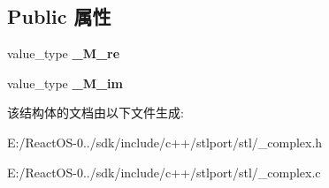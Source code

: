 \subsection*{Public 属性}
\begin{DoxyCompactItemize}
\item 
\mbox{\label{structcomplex_abb9990a2044d7b2610481b5270f04399}} 
value\+\_\+type {\bfseries \+\_\+\+M\+\_\+re}
\item 
\mbox{\label{structcomplex_aacccfe6cd1745a20913e61564a50c155}} 
value\+\_\+type {\bfseries \+\_\+\+M\+\_\+im}
\end{DoxyCompactItemize}


该结构体的文档由以下文件生成\+:\begin{DoxyCompactItemize}
\item 
E\+:/\+React\+O\+S-\/0../sdk/include/c++/stlport/stl/\+\_\+complex.\+h\item 
E\+:/\+React\+O\+S-\/0../sdk/include/c++/stlport/stl/\+\_\+complex.\+c\end{DoxyCompactItemize}
